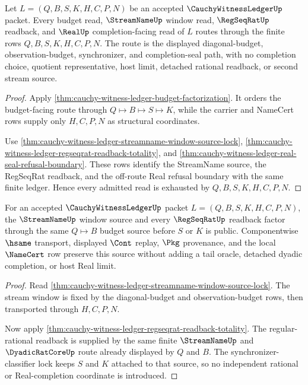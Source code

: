 \begin{theorem}
\label{thm:cauchy-witness-ledger-budget-real-route-totality}
Let $L=(Q,B,S,K,H,C,P,N)$ be an accepted $\CauchyWitnessLedgerUp$ packet. Every budget read, $\StreamNameUp$ window read, $\RegSeqRatUp$ readback, and $\RealUp$ completion-facing read of $L$ routes through the finite rows $Q,B,S,K,H,C,P,N$. The route is the displayed diagonal-budget, observation-budget, synchronizer, and completion-seal path, with no completion choice, quotient representative, host limit, detached rational readback, or second stream source.
\end{theorem}
\begin{proof}
Apply \autoref{thm:cauchy-witness-ledger-budget-factorization}. It orders the budget-facing route through $Q \longmapsto B \longmapsto S \longmapsto K$, while the carrier and NameCert rows supply only $H,C,P,N$ as structural coordinates.

Use \autoref{thm:cauchy-witness-ledger-streamname-window-source-lock}, \autoref{thm:cauchy-witness-ledger-regseqrat-readback-totality}, and \autoref{thm:cauchy-witness-ledger-real-seal-refusal-boundary}. These rows identify the StreamName source, the RegSeqRat readback, and the off-route Real refusal boundary with the same finite ledger. Hence every admitted read is exhausted by $Q,B,S,K,H,C,P,N$.
\end{proof}

\begin{theorem}
\label{thm:cauchy-witness-ledger-streamname-regseq-factorization}
For an accepted $\CauchyWitnessLedgerUp$ packet $L=(Q,B,S,K,H,C,P,N)$, the $\StreamNameUp$ window source and every $\RegSeqRatUp$ readback factor through the same $Q \longmapsto B$ budget source before $S$ or $K$ is public. Componentwise $\hsame$ transport, displayed $\Cont$ replay, $\Pkg$ provenance, and the local $\NameCert$ row preserve this source without adding a tail oracle, detached dyadic completion, or host Real limit.
\end{theorem}
\begin{proof}
Read \autoref{thm:cauchy-witness-ledger-streamname-window-source-lock}. The stream window is fixed by the diagonal-budget and observation-budget rows, then transported through $H,C,P,N$.

Now apply \autoref{thm:cauchy-witness-ledger-regseqrat-readback-totality}. The regular-rational readback is supplied by the same finite $\StreamNameUp$ and $\DyadicRatCoreUp$ route already displayed by $Q$ and $B$. The synchronizer-classifier lock keeps $S$ and $K$ attached to that source, so no independent rational or Real-completion coordinate is introduced.
\end{proof}

